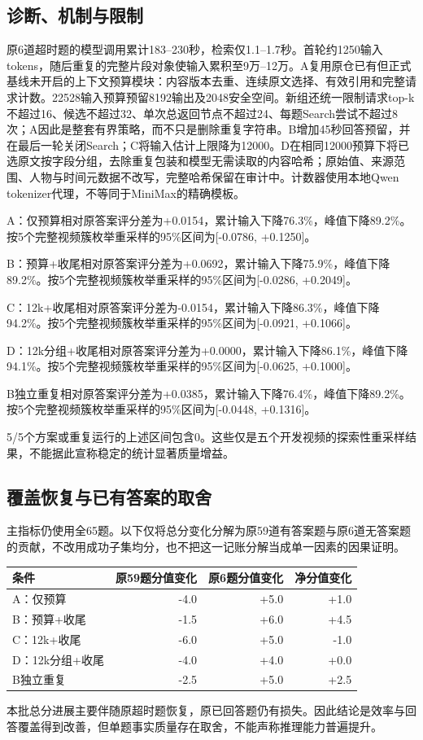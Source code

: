 \subsection{诊断、机制与限制}
原6道超时题的模型调用累计183--230秒，检索仅1.1--1.7秒。首轮约1250输入tokens，随后重复的完整片段对象使输入累积至9万--12万。A复用原仓已有但正式基线未开启的上下文预算模块：内容版本去重、连续原文选择、有效引用和完整请求计数。22528输入预算预留8192输出及2048安全空间。新组还统一限制请求top-k不超过16、候选不超过32、单次总返回节点不超过24、每题Search尝试不超过8次；A因此是整套有界策略，而不只是删除重复字符串。B增加45秒回答预留，并在最后一轮关闭Search；C将输入估计上限降为12000。D在相同12000预算下将已选原文按字段分组，去除重复包装和模型无需读取的内容哈希；原始值、来源范围、人物与时间元数据不改写，完整哈希保留在审计中。计数器使用本地Qwen tokenizer代理，不等同于MiniMax的精确模板。

A：仅预算相对原答案评分差为+0.0154，累计输入下降76.3\%，峰值下降89.2\%。按5个完整视频簇枚举重采样的95\%区间为[-0.0786, +0.1250]。

B：预算+收尾相对原答案评分差为+0.0692，累计输入下降75.9\%，峰值下降89.2\%。按5个完整视频簇枚举重采样的95\%区间为[-0.0286, +0.2049]。

C：12k+收尾相对原答案评分差为-0.0154，累计输入下降86.3\%，峰值下降94.2\%。按5个完整视频簇枚举重采样的95\%区间为[-0.0921, +0.1066]。

D：12k分组+收尾相对原答案评分差为+0.0000，累计输入下降86.1\%，峰值下降94.1\%。按5个完整视频簇枚举重采样的95\%区间为[-0.0625, +0.1000]。

B独立重复相对原答案评分差为+0.0385，累计输入下降76.4\%，峰值下降89.2\%。按5个完整视频簇枚举重采样的95\%区间为[-0.0448, +0.1316]。

5/5个方案或重复运行的上述区间包含0。这些仅是五个开发视频的探索性重采样结果，不能据此宣称稳定的统计显著质量增益。
\subsection{覆盖恢复与已有答案的取舍}
主指标仍使用全65题。以下仅将总分变化分解为原59道有答案题与原6道无答案题的贡献，不改用成功子集均分，也不把这一记账分解当成单一因素的因果证明。
\begin{center}\small\begin{tabular}{lrrr}\toprule
条件 & 原59题分值变化 & 原6题分值变化 & 净分值变化\\\midrule
A：仅预算 & -4.0 & +5.0 & +1.0\\
B：预算+收尾 & -1.5 & +6.0 & +4.5\\
C：12k+收尾 & -6.0 & +5.0 & -1.0\\
D：12k分组+收尾 & -4.0 & +4.0 & +0.0\\
B独立重复 & -2.5 & +5.0 & +2.5\\
\bottomrule\end{tabular}\end{center}
本批总分进展主要伴随原超时题恢复，原已回答题仍有损失。因此结论是效率与回答覆盖得到改善，但单题事实质量存在取舍，不能声称推理能力普遍提升。
